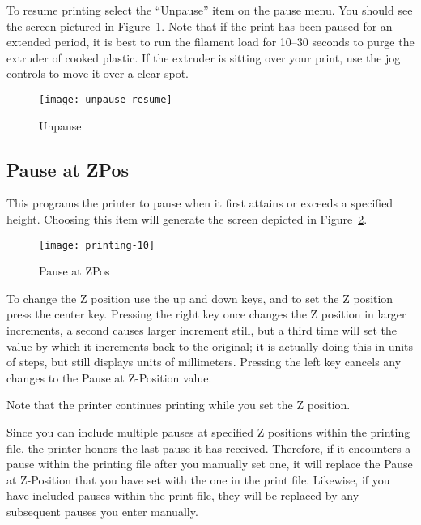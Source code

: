 To resume printing select the ``Unpause'' item on the pause menu.  You should see the screen pictured in Figure~\ref{fig:endpause}.  Note that if the print has been paused for an extended period, it is best to run the filament load for 10--30 seconds to purge the extruder of cooked plastic.  If the extruder is sitting over your print, use the jog controls to move it over a clear spot.  

\begin{figure}[!htbp]
  \centering
    \texttt{[image: unpause-resume]}
    \caption{Unpause}
  \label{fig:endpause}
\end{figure}


\subsection{Pause at ZPos}\label{sec:zpos}

This programs the printer to pause when it first attains or exceeds a specified height.  Choosing this item will generate the screen depicted in Figure~\ref{fig:Zpause}.

\begin{figure}[!htbp]
  \centering
    \texttt{[image: printing-10]}
    \caption{Pause at ZPos}
  \label{fig:Zpause}
\end{figure}

To change the Z position use the up and down keys, and to set the Z position press the center key.  Pressing the right key once changes the Z position in larger increments, a second causes larger increment still, but a third time will set the value by which it increments back to the original; it is actually doing this in units of steps, but still displays units of millimeters.  Pressing the left key cancels any changes to the Pause at Z-Position value.

Note that the printer continues printing while you set the Z position.

Since you can include multiple pauses at specified Z positions within the printing file, the printer honors the last pause it has received.  Therefore, if it encounters a pause within the printing file after you manually set one, it will replace the Pause at Z-Position that you have set with the one in the print file.  Likewise, if you have included pauses within the print file, they will be replaced by any subsequent pauses you enter manually.

